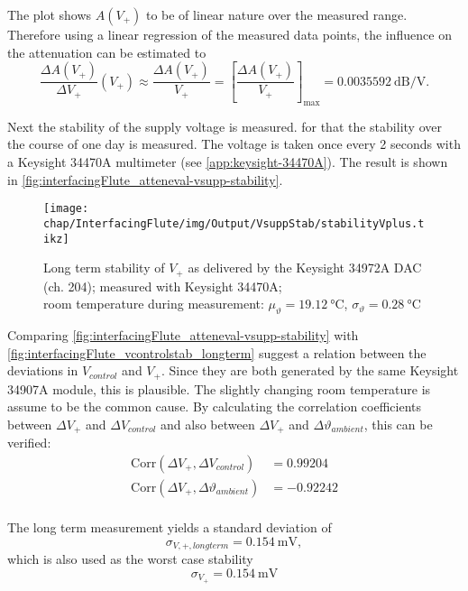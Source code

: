The plot shows $A(V_+)$ to be of linear nature over the measured range.
Therefore using a linear regression of the measured data points, the influence on the attenuation can be estimated to
\begin{equation}
\frac{\Delta A(V_+)}{\Delta V_+}(V_+) 
\approx \frac{\Delta A(V_+)}{V_+} 
= \left[\frac{\Delta A(V_+)}{V_+}\right]_\text{max}
=\SI{0.0035592}{\dB\per\volt}.
\end{equation}

Next the stability of the supply voltage is measured.
for that the stability over the course of one day is measured. The voltage is taken once every 2 seconds with a Keysight 34470A multimeter (see \autoref{app:keysight-34470A}). The result is shown in \autoref{fig:interfacingFlute_atteneval-vsupp-stability}.

\begin{figure}[tb]
	\centering
	\texttt{[image: chap/InterfacingFlute/img/Output/VsuppStab/stabilityVplus.tikz]}
	\caption{Long term stability of $V_{+}$ as delivered by the Keysight 34972A DAC (ch. 204); measured with Keysight 34470A;\\room temperature during measurement: $\mu_\vartheta=\SI{19.12}{\degreeCelsius}$, $\sigma_\vartheta=\SI{0.28}{\degreeCelsius}$}
	\label{fig:interfacingFlute_atteneval-vsupp-stability}
\end{figure}

Comparing \autoref{fig:interfacingFlute_atteneval-vsupp-stability} with \autoref{fig:interfacingFlute_vcontrolstab_longterm} suggest a relation between the deviations in $V_{control}$ and $V_+$. Since they are both generated by the same Keysight 34907A module, this is plausible. The slightly changing room temperature is assume to be the common cause.
By calculating the correlation coefficients between $\Delta V_+$ and $\Delta V_{control}$ and also between $\Delta V_+$ and $\Delta \vartheta_{ambient}$, this can be verified:
\begin{align}
\text{Corr}(\Delta V_+,\Delta V_{control})         &= \num{0.99204} \\
\text{Corr}(\Delta V_+,\Delta \vartheta_{ambient}) &= \num{-0.92242} \\
\end{align}

The long term measurement yields a standard deviation of
\begin{equation}
\sigma_{V,+,longterm} = \SI{0.154}{\milli\volt},
\end{equation}
which is also used as the worst case stability
\begin{equation}
\sigma_{V_+} = \SI{0.154}{\milli\volt}
\end{equation}

